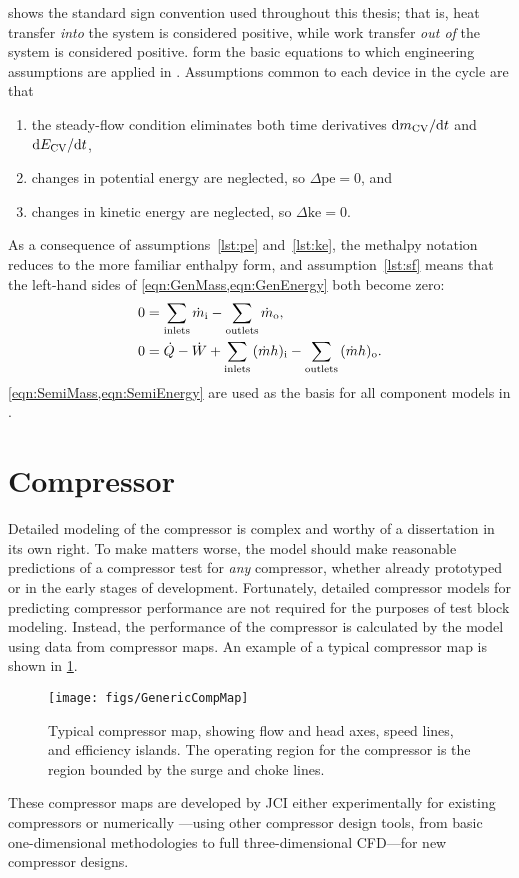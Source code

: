  shows the standard sign convention used throughout this thesis; 
that is, heat transfer \emph{into} the system is considered positive, 
while work transfer \emph{out of} the system is considered positive.
 form the basic equations to which 
engineering assumptions are applied in .
Assumptions common to each device in the cycle are that
\begin{enumerate}
  \item the steady-flow condition eliminates both time derivatives $\mathop{}\!\mathrm{d}{m_{\mathrm{CV}}}/\!\mathop{}\!\mathrm{d}{t}$ and $\mathop{}\!\mathrm{d}{E_{\mathrm{CV}}}/\!\mathop{}\!\mathrm{d}{t}$, \label{lst:sf}
  \item changes in potential energy are neglected, so $\Delta \text{pe} = 0$, and \label{lst:pe}
  \item changes in kinetic energy are neglected, so $\Delta \text{ke} = 0$. \label{lst:ke}
\end{enumerate}
As a consequence of assumptions~\ref{lst:pe} and~\ref{lst:ke},
the methalpy notation reduces to the more familiar enthalpy form,
and assumption~\ref{lst:sf} means that the left-hand sides of \cref{eqn:GenMass,eqn:GenEnergy} both become zero:
\begin{align}
  0 &= \sum_{\text{inlets}}{\dot{m}_{\text{i}}} - \sum_{\text{outlets}}{\dot{m}_{\text{o}}}, \label{eqn:SemiMass}\\
  0 &= \dot{Q} - \dot{W} + \sum_{\text{inlets}}{(\dot{m}h)_{\text{i}}} - \sum_{\text{outlets}}{(\dot{m}h)_{\text{o}}}. \label{eqn:SemiEnergy}
\end{align}
\cref{eqn:SemiMass,eqn:SemiEnergy} are used as the basis for all component models
in .

\section{Compressor} \label{sec:Compressor}
Detailed modeling of the compressor is complex and worthy of a dissertation in its own right. 
To make matters worse, the model should make reasonable predictions 
of a compressor test for \emph{any} compressor, 
whether already prototyped or in the early stages of development.
Fortunately, detailed compressor models 
for predicting compressor performance are not required for the purposes of test block modeling. 
Instead, the performance of the compressor is calculated by the model using
data from compressor maps. 
An example of a typical compressor map is shown in \cref{fig:GenMap}. 
\begin{figure}[htbp]
  \centering
  \texttt{[image: figs/GenericCompMap]}
  \caption{Typical compressor map, showing flow and head axes, speed lines, and efficiency islands.
    The operating region for the compressor is the region bounded by the surge and choke lines.}
  \label{fig:GenMap}
\end{figure}
These compressor maps are developed by JCI either 
experimentally for existing compressors or numerically%
---using other compressor design tools, from basic one-dimensional methodologies
to full three-dimensional CFD---for new compressor designs.

